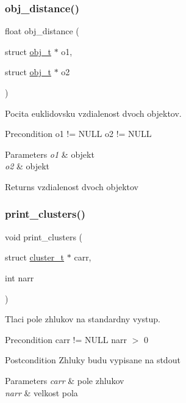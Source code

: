 \subsubsection{\texorpdfstring{obj\+\_\+distance()}{obj\_distance()}}
{\footnotesize\ttfamily float obj\+\_\+distance (\begin{DoxyParamCaption}\item[{struct \hyperlink{structobj__t}{obj\+\_\+t} $\ast$}]{o1,  }\item[{struct \hyperlink{structobj__t}{obj\+\_\+t} $\ast$}]{o2 }\end{DoxyParamCaption})}

Pocita euklidovsku vzdialenost dvoch objektov.

\begin{DoxyPrecond}{Precondition}
o1 != N\+U\+LL o2 != N\+U\+LL
\end{DoxyPrecond}

\begin{DoxyParams}{Parameters}
{\em o1} & objekt \\
\hline
{\em o2} & objekt \\
\hline
\end{DoxyParams}
\begin{DoxyReturn}{Returns}
vzdialenost dvoch objektov 
\end{DoxyReturn}
\mbox{\label{group__clusts_gad350e6021e5fead00ff2eeec4d134525}} 
\subsubsection{\texorpdfstring{print\+\_\+clusters()}{print\_clusters()}}
{\footnotesize\ttfamily void print\+\_\+clusters (\begin{DoxyParamCaption}\item[{struct \hyperlink{structcluster__t}{cluster\+\_\+t} $\ast$}]{carr,  }\item[{int}]{narr }\end{DoxyParamCaption})}

Tlaci pole zhlukov na standardny vystup.

\begin{DoxyPrecond}{Precondition}
carr != N\+U\+LL narr $>$ 0
\end{DoxyPrecond}
\begin{DoxyPostcond}{Postcondition}
Zhluky budu vypisane na stdout
\end{DoxyPostcond}

\begin{DoxyParams}{Parameters}
{\em carr} & pole zhlukov \\
\hline
{\em narr} & velkost pola \\
\hline
\end{DoxyParams}
